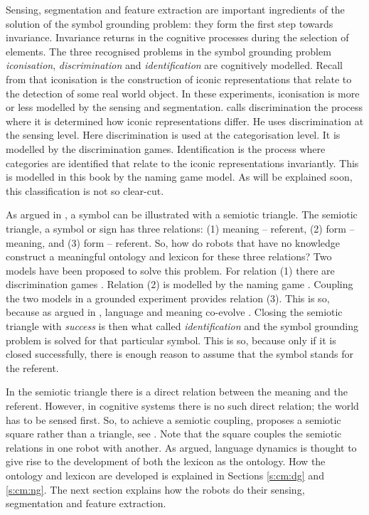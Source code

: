 Sensing, segmentation and feature extraction are important ingredients of the solution of the symbol grounding problem: they form the first step towards invariance. Invariance returns in the cognitive processes during the selection of elements. The three recognised problems in the symbol grounding problem {\em iconisation}, {\em discrimination} and {\em identification} \citep{harnad:1990} are cognitively modelled. Recall from  that iconisation is the construction of iconic representations that relate to the detection of some real world object. In these experiments, iconisation is more or less modelled by the sensing and segmentation. \citet{harnad:1990} calls discrimination the process where it is determined how iconic representations differ. He uses discrimination at the sensing level. Here discrimination is used at the categorisation level. It is modelled by the discrimination games. Identification is the process where categories are identified that relate to the iconic representations invariantly. This is modelled in this book by the naming game model. As will be explained soon, this classification is not so clear-cut.

As argued in , a symbol can be illustrated with a semiotic triangle. The semiotic triangle, a symbol or sign has three relations: (1) meaning -- referent, (2) form -- meaning, and (3) form -- referent. So, how do robots that have no knowledge construct a meaningful ontology and lexicon for these three relations? Two models have been proposed to solve this problem. For relation (1) there are discrimination games \citep{steels:1996b}. Relation (2) is modelled by the naming game \citep{steels:1996a}. Coupling the two models in a grounded experiment provides relation (3). This is so, because as argued in , language and meaning co-evolve \citep{steels:1997a}. Closing the semiotic triangle with {\em success} is then what \citet{harnad:1990} called {\em identification} and the symbol grounding problem is solved for that particular symbol. This is so, because only if it is closed successfully, there is enough reason to assume that the symbol stands for the referent.

In the semiotic triangle there is a direct relation between the meaning and the referent. However, in cognitive systems there is no such direct relation; the world has to be sensed first. So, to achieve a semiotic coupling, \citet{steels:2000} proposes a semiotic square rather than a triangle, see . Note that the square couples the semiotic relations in one robot with another. As argued, language dynamics is thought to give rise to the development of both the lexicon as the ontology. How the ontology and lexicon are developed is explained in Sections \ref{s:cm:dg} and \ref{s:cm:ng}. The next section explains how the robots do their sensing, segmentation and feature extraction.

